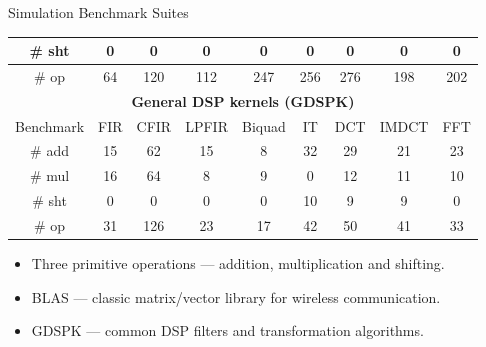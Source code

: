 \documentclass{beamer}
\begin{document}
\begin{CJK}{UTF8}{bkai}
\begin{frame}{Simulation Benchmark Suites}
\begin{table}[!ht]
{\begin{tabular}{|c|c|c|c|c|c|c|c|c|}
                            \# sht            &   0    &   0    &    0    &     0    &    0   &   0  &    0   &   0   \\ \hline
                            \# op             &  64    & 120    &  112    &   247    &  256   & 276  &  198   & 202   \\ \hline
                            \multicolumn{9}{|c|}{\textbf{General DSP kernels (GDSPK)}}                     \\ \hline
                            Benchmark              & FIR    & CFIR   & LPFIR   & Biquad   & IT     & DCT  & IMDCT  & FFT   \\ \hline
                            \# add            & 15     &  62    &   15    &    8     &  32    &  29  &   21   &  23   \\ \hline
                            \# mul            & 16     &  64    &    8    &    9     &   0    &  12  &   11   &  10   \\ \hline
                            \# sht            &  0     &   0    &    0    &    0     &  10    &   9  &    9   &   0   \\ \hline
                            \# op             & 31     & 126    &   23    &   17     &  42    &  50  &   41   &  33   \\ \hline
                        \end{tabular}
                    }
                \end{table}
                \begin{itemize}
                    \item Three primitive operations --- addition, multiplication and shifting.
                    \item BLAS --- classic matrix/vector library for wireless communication.
                    \item GDSPK --- common DSP filters and transformation algorithms.
                \end{itemize}
            \end{frame}


\end{CJK}
\end{document}
